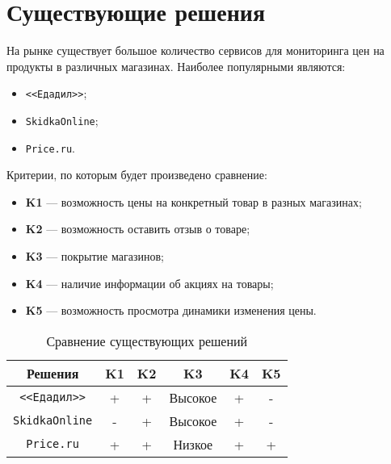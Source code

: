 \section{Существующие решения}

На рынке существует большое количество сервисов для мониторинга цен на продукты в различных магазинах. Наиболее популярными являются:

\begin{itemize}[label=--]
	\item \texttt{<<Едадил>>};
	\item \texttt{SkidkaOnline};
	\item \texttt{Price.ru}.
\end{itemize}

Критерии, по которым будет произведено сравнение:

\begin{itemize}[label=--]
	\item \textbf{K1} --- возможность цены на конкретный товар в разных магазинах;
	\item \textbf{K2} --- возможность оставить отзыв о товаре;
	\item \textbf{K3} --- покрытие магазинов;
	\item \textbf{K4} --- наличие информации об акциях на товары;
	\item \textbf{K5} --- возможность просмотра динамики изменения цены.
\end{itemize}

\clearpage

\begin{table}[ht]
	\small
	\begin{center}
		\begin{threeparttable}
			\caption{Сравнение существующих решений}
			\label{tbl:exist_sol}
			\begin{tabular}{|c|c|c|c|c|c|}
				\hline
				Решения & \textbf{K1} & \textbf{K2} & \textbf{K3} & \textbf{K4} & \textbf{K5} \\
				\hline
				\texttt{<<Едадил>>} & + & + & Высокое & + & - \\
				\hline
				\texttt{SkidkaOnline} & - & + & Высокое & + & - \\
				\hline
				\texttt{Price.ru} & + & + & Низкое & + & + \\
				\hline
			\end{tabular}
		\end{threeparttable}			
	\end{center}
\end{table}

